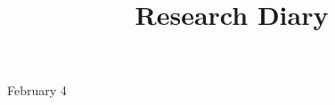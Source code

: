 \documentclass[11pt,letterpaper]{article}
\begin{document}

\title{Research Diary}

{\Huge February 4}\\[5mm]
\end{document}
